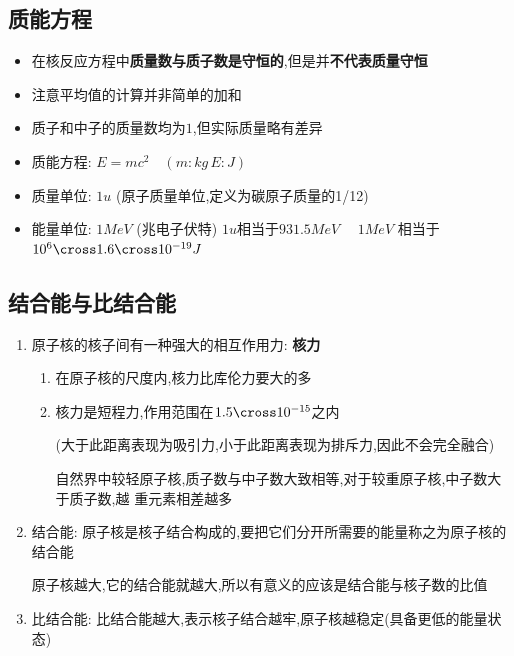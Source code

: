 \documentclass{article}
\begin{document}
\vspace*{2em}

\subsection{质能方程}
\begin{itemize}
    \item 在核反应方程中\textbf{质量数与质子数是守恒的},但是并\textbf{不代表质量守恒}
    \item 注意平均值的计算并非简单的加和
    \item 质子和中子的质量数均为$1$,但实际质量略有差异
    \item 质能方程: $ E = mc^{2} \quad (m:kg \, E:J)$
    \item 质量单位: $1u$ (原子质量单位,定义为碳原子质量的1/12)
    \item 能量单位: $1MeV$ (兆电子伏特) \quad $1u$相当于$ 931.5 MeV \quad $ $ 1MeV $ 相当于 $10^{6} \cross 1.6 \cross 10^{-19} J  $
\end{itemize}

\subsection{结合能与比结合能}
\begin{enumerate}
    \item 原子核的核子间有一种强大的相互作用力: \textbf{核力}
          \begin{enumerate}[label = (\alph*{})]
              \item 在原子核的尺度内,核力比库伦力要大的多
              \item 核力是短程力,作用范围在$1.5\cross10^{-15}$之内

                    (大于此距离表现为吸引力,小于此距离表现为排斥力,因此不会完全融合)

                    \vspace{-1em}
                    \hspace{-0.9em}\begin{adjustbox}{minipage=0.92\linewidth, bgcolor=gray!20, padding=1em}
                        \small %
                        自然界中较轻原子核,质子数与中子数大致相等,对于较重原子核,中子数大于质子数,越
                        重元素相差越多
                    \end{adjustbox}
                    \vspace{-1em}

          \end{enumerate}

    \item 结合能: 原子核是核子结合构成的,要把它们分开所需要的能量称之为原子核的结合能

          原子核越大,它的结合能就越大,所以有意义的应该是结合能与核子数的比值

    \item 比结合能: 比结合能越大,表示核子结合越牢,原子核越稳定(具备更低的能量状态)

\end{enumerate}
\end{document}
